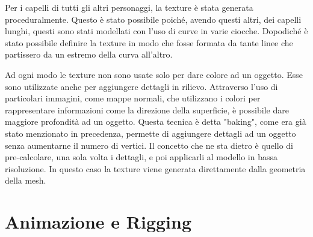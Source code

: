 Per i capelli di tutti gli altri personaggi, la texture è stata generata proceduralmente. Questo è stato possibile poiché, avendo questi altri, dei capelli lunghi, questi sono stati modellati con l'uso di curve in varie ciocche.
Dopodiché è stato possibile definire la texture in modo che fosse formata da tante linee che partissero da un estremo della curva all'altro.

Ad ogni modo le texture non sono usate solo per dare colore ad un oggetto. Esse sono utilizzate anche per aggiungere dettagli in rilievo.
Attraverso l'uso di particolari immagini, come mappe normali, che utilizzano i colori per rappresentare informazioni come la direzione della superficie, è possibile dare maggiore profondità ad un oggetto.
Questa tecnica è detta "baking", come era già stato menzionato in precedenza, permette di aggiungere dettagli ad un oggetto senza aumentarne il numero di vertici.
Il concetto che ne sta dietro è quello di pre-calcolare, una sola volta i dettagli, e poi applicarli al modello in bassa risoluzione.
In questo caso la texture viene generata direttamente dalla geometria della mesh.

\newpage
\section{Animazione e Rigging}

